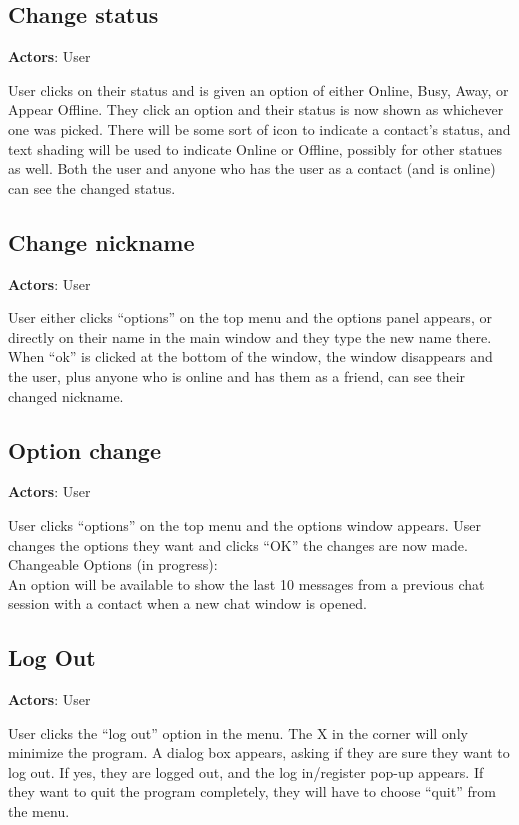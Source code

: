 \subsection*{Change status}

{\bf Actors}: User

User clicks on their status and is given an option of either Online, Busy, Away, or Appear Offline. They click an option and their status is now shown as whichever one was picked. There will be some sort of icon to indicate a contact’s status, and text shading will be used to indicate Online or Offline, possibly for other statues as well. Both the user and anyone who has the user as a contact (and is online) can see the changed status.

\subsection*{Change nickname}

{\bf Actors}: User

User either clicks ``options'' on the top menu and the options panel appears, or directly on their name in the main window and they type the new name there. When ``ok'' is clicked at the bottom of the window, the window disappears and the user, plus anyone who is online and has them as a friend, can see their changed nickname.

\subsection*{Option change}

{\bf Actors}: User

User clicks ``options'' on the top menu and the options window appears. User changes the options they want and clicks ``OK'' the changes are now made. \\
Changeable Options (in progress):\\
An option will be available to show the last 10 messages from a previous chat session with a contact when a new chat window is opened.

\subsection*{Log Out}

{\bf Actors}: User

User clicks the ``log out'' option in the menu. The X in the corner will only minimize the program. A dialog box appears, asking if they are sure they want to log out. If yes, they are logged out, and the log in/register pop-up appears. If they want to quit the program completely, they will have to choose ``quit'' from the menu.

